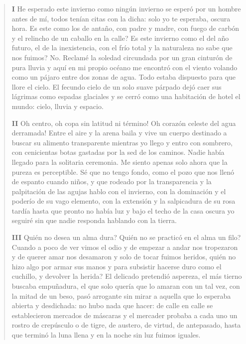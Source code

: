 \documentclass[12pt]{article}
\begin{document}
\clearpage
{}
\begin{verse}
\vspace{\baselineskip}
{\scshape\bfseries I}
He esperado este invierno como ningún invierno  
se esperó por un hombre antes de mí,  
todos tenían citas con la dicha:  
solo yo te esperaba, oscura hora.  
Es este como los de antaño, con padre y madre, con fuego  
de carbón y el relincho de un caballo en la calle?  
Es este invierno como el del año futuro,  
el de la inexistencia, con el frío total  
y la naturaleza no sabe que nos fuimos?  
No. Reclamé la soledad circundada  
por un gran cinturón de pura lluvia  
y aquí en mi propio océano me encontró con el viento  
volando como un pájaro entre dos zonas de agua.  
Todo estaba dispuesto para que llore el cielo.  
El fecundo cielo de un solo suave párpado  
dejó caer sus lágrimas como espadas glaciales  
y se cerró como una habitación de hotel  
el mundo: cielo, lluvia y espacio.  

\vspace{\baselineskip}
{\scshape\bfseries II}
Oh centro, oh copa sin latitud ni término!  
Oh corazón celeste del agua derramada!  
Entre el aire y la arena baila y vive  
un cuerpo destinado  
a buscar su alimento transparente  
mientras yo llego y entro con sombrero,  
con cenicientas botas  
gastadas por la sed de los caminos.  
Nadie había llegado  
para la solitaria ceremonia.  
Me siento apenas solo  
ahora que la pureza es perceptible.  
Sé que no tengo fondo, como el pozo  
que nos llenó de espanto cuando niños,  
y que rodeado por la transparencia  
y la palpitación de las agujas  
hablo con el invierno,  
con la dominación y el poderío  
de su vago elemento,  
con la extensión y la salpicadura  
de su rosa tardía  
hasta que pronto no había luz  
y bajo el techo  
de la casa oscura  
yo seguiré sin que nadie responda  
hablando con la tierra.  

\vspace{\baselineskip}
{\scshape\bfseries III}
Quién no desea un alma dura?  
Quién no se practicó en el alma un filo?  
Cuando a poco de ver vimos el odio  
y de empezar a andar nos tropezaron  
y de querer amar nos desamaron  
y solo de tocar fuimos heridos,  
quién no hizo algo por armar sus manos  
y para subsistir hacerse duro  
como el cuchillo, y devolver la herida?  
El delicado pretendió aspereza,  
el más tierno buscaba empuñadura,  
el que solo quería que lo amaran  
con un tal vez, con la mitad de un beso,  
pasó arrogante sin mirar a aquella  
que lo esperaba abierta y desdichada:  
no hubo nada que hacer: de calle en calle  
se establecieron mercados de máscaras  
y el mercader probaba a cada uno  
un rostro de crepúsculo o de tigre,  
de austero, de virtud, de antepasado,  
hasta que terminó la luna llena  
y en la noche sin luz fuimos iguales.  


\end{verse}
\end{document}
